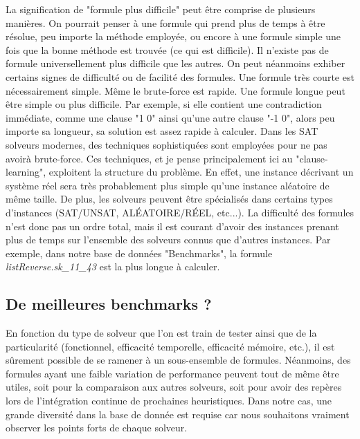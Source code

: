 \documentclass[11pt,a4paper]{article}
\begin{document}
 La signification de "formule plus difficile" peut être comprise de plusieurs manières. On pourrait penser à une formule qui prend plus de temps à être résolue, peu importe la méthode employée, ou encore à une formule simple une fois que la bonne méthode est trouvée (ce qui est difficile). 
 Il n'existe pas de formule universellement plus difficile que les autres. On peut néanmoins exhiber certains signes de difficulté ou de facilité des formules. 
 Une formule très courte est nécessairement simple. Même le brute-force est rapide.
 Une formule longue peut être simple ou plus difficile. Par exemple, si elle contient une contradiction immédiate, comme une clause "1 0" ainsi qu'une autre clause "-1 0", alors peu importe sa longueur, sa solution est assez rapide à calculer. Dans les SAT solveurs modernes, des techniques sophistiquées sont employées pour ne pas avoirà brute-force. Ces techniques, et je pense principalement ici au "clause-learning", exploitent la structure du problème. En effet, une instance décrivant un système réel sera très probablement plus simple qu'une instance aléatoire de même taille. 
De plus, les solveurs peuvent être spécialisés dans certains types d'instances (SAT/UNSAT, ALÉATOIRE/RÉEL, etc...).
La difficulté des formules n'est donc pas un ordre total, mais il est courant d'avoir des instances prenant plus de temps sur l'ensemble des solveurs connus que d'autres instances. Par exemple, dans notre base de données "Benchmarks", la formule \textit{listReverse.sk\_11\_43} est la plus longue à calculer.



\subsection{De meilleures benchmarks ?}

En fonction du type de solveur que l'on est train de tester ainsi que de la particularité (fonctionnel, efficacité temporelle, efficacité mémoire, etc.), il est sûrement possible de se ramener à un sous-ensemble de formules. Néanmoins, des formules ayant une faible variation de performance peuvent tout de même être utiles, soit pour la comparaison aux autres solveurs, soit pour avoir des repères lors de l'intégration continue de prochaines heuristiques. 
Dans notre cas, une grande diversité dans la base de donnée est requise car nous souhaitons vraiment observer les points forts de chaque solveur.
\end{document}
